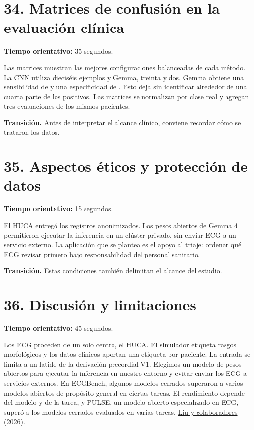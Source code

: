 \documentclass[11pt,a4paper]{article}
\begin{document}
\section*{34. Matrices de confusión en la evaluación clínica}
\textbf{Tiempo orientativo: }35 segundos.

Las matrices muestran las mejores configuraciones balanceadas de cada método. La CNN utiliza dieciséis ejemplos y Gemma, treinta y dos. Gemma obtiene una sensibilidad de \RealVlmSens{} y una especificidad de \RealVlmSpec{}. Esto deja sin identificar alrededor de una cuarta parte de los positivos. Las matrices se normalizan por clase real y agregan tres evaluaciones de los mismos pacientes.

\textbf{Transición.} Antes de interpretar el alcance clínico, conviene recordar cómo se trataron los datos.

\section*{35. Aspectos éticos y protección de datos}
\textbf{Tiempo orientativo: }15 segundos.

El HUCA entregó los registros anonimizados. Los pesos abiertos de Gemma 4 permitieron ejecutar la inferencia en un clúster privado, sin enviar ECG a un servicio externo. La aplicación que se plantea es el apoyo al triaje: ordenar qué ECG revisar primero bajo responsabilidad del personal sanitario.

\textbf{Transición.} Estas condiciones también delimitan el alcance del estudio.

\section*{36. Discusión y limitaciones}
\textbf{Tiempo orientativo: }45 segundos.

Los ECG proceden de un solo centro, el HUCA. El simulador etiqueta rasgos morfológicos y los datos clínicos aportan una etiqueta por paciente. La entrada se limita a un latido de la derivación precordial V1. Elegimos un modelo de pesos abiertos para ejecutar la inferencia en nuestro entorno y evitar enviar los ECG a servicios externos. En ECGBench, algunos modelos cerrados superaron a varios modelos abiertos de propósito general en ciertas tareas. El rendimiento depende del modelo y de la tarea, y PULSE, un modelo abierto especializado en ECG, superó a los modelos cerrados evaluados en varias tareas. \href{https://aimedlab.github.io/PULSE/}{Liu y colaboradores (2026).}
\end{document}
